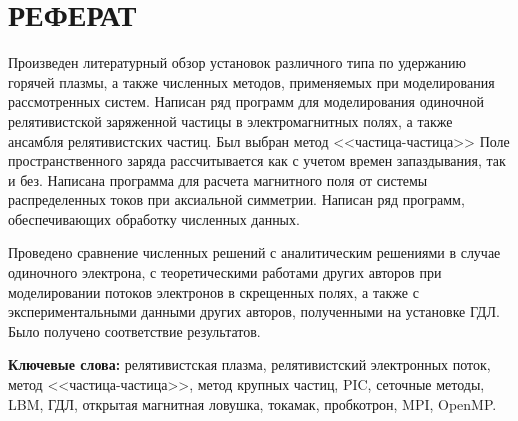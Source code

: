 \chapter*{РЕФЕРАТ}             %

Произведен литературный обзор установок различного типа по удержанию горячей плазмы, а также численных методов, применяемых при моделирования рассмотренных систем. Написан ряд программ для моделирования одиночной релятивистской заряженной частицы в электромагнитных полях, а также ансамбля релятивистских частиц. Был выбран метод <<частица-частица>> Поле пространственного заряда рассчитывается как с учетом времен запаздывания, так и без. Написана программа для расчета магнитного поля от системы распределенных токов при аксиальной симметрии. Написан ряд программ, обеспечивающих обработку численных данных.

Проведено сравнение численных решений с аналитическим решениями в случае одиночного электрона, с теоретическими работами других авторов при моделировании потоков электронов в скрещенных полях, а также с экспериментальными данными других авторов, полученными на установке ГДЛ. Было получено соответствие результатов.

\textbf{Ключевые слова:} релятивистская плазма, релятивистский электронных поток, метод <<частица-частица>>, метод крупных частиц, PIC, сеточные методы, LBM, ГДЛ, открытая магнитная ловушка, токамак, пробкотрон, MPI, OpenMP.